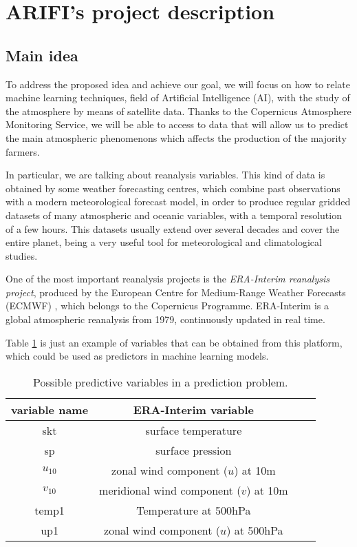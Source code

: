 \section{ARIFI's project description}
\subsection{Main idea}

To address the proposed idea and achieve our goal, we will focus on how to relate machine learning techniques, field of Artificial Intelligence (AI), with the study of the atmosphere by means of satellite data. Thanks to the Copernicus Atmosphere Monitoring Service, we will be able to access to data that will allow us to predict the main atmospheric phenomenons which affects the production of the majority farmers.

In particular, we are talking about reanalysis variables. This kind of data is obtained by some weather forecasting centres, which combine past observations with a modern meteorological forecast model, in order to produce regular gridded datasets of many atmospheric and oceanic variables, with a temporal resolution of a few hours. This datasets usually extend over several decades and cover the entire planet, being a very useful tool for meteorological and climatological studies.

One of the most important reanalysis projects is the {\em ERA-Interim reanalysis project}, produced by the European Centre for Medium-Range Weather Forecasts (ECMWF) \cite{ERA_Interim}, which belongs to the Copernicus Programme. ERA-Interim is a global atmospheric reanalysis from 1979, continuously updated in real time.

Table \ref{Variables_ERA} is just an example of variables that can be obtained from this platform, which could be used as predictors in machine learning models.

\vspace{12pt}
\begin{table}[H]
\begin{center}
\caption{\label{Variables_ERA} Possible predictive variables in a prediction problem.}
\begin{tabular}{cccc}
\hline
variable name & ERA-Interim variable\\
\hline
\hline
skt & surface temperature\\
sp & surface pression\\
$u_{10}$& zonal wind component ($u$) at 10m\\
$v_{10}$& meridional wind component ($v$) at 10m\\
temp1& Temperature at 500hPa\\
up1& zonal wind component ($u$) at 500hPa\\
\hline
\end{tabular}
\end{center}
\end{table}
\vspace{12pt}

